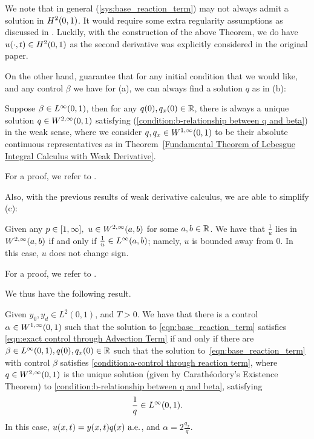 \documentclass{ifacconf}
\begin{document}
\begin{rem}
    We note that in general (\ref{sys:base_reaction_term}) may not always admit a solution in ${H^{2}_{}{\left ( 0,1 \right )}}$. It would require some extra regularity assumptions as discussed in \cite{evans_partial_2010}. Luckily, with the construction of the above Theorem, we do have $u(\cdot, t) \in {H^{2}_{}{\left ( 0,1 \right )}}$ as the second derivative was explicitly considered in the original paper.
\end{rem} 

On the other hand, \cite[Theorems 5.1 and 5.3, p. 30]{hale_ordinary_1980} guarantee that for any initial condition that we would like, and any control $\beta$ we have for (a), we can always find a solution $q$ as in (b):
\begin{prop}
    Suppose $\beta \in {L^{\infty}_{}{\left ( 0,1 \right )}}$, then for any $q(0), q_x(0) \in {\mathbb{R}}$,
    there is always a unique solution $q \in {W^{2, \infty}_{}{\left ( 0,1 \right )}}$ satisfying (\ref{condition:b-relationship between q and beta}) in the weak sense, where we consider $q, q_x \in {W^{1, \infty}_{}{\left ( 0,1 \right )}}$ to be their absolute continuous representatives as in Theorem~\ref{Fundamental Theorem of Lebesgue Integral Calculus with Weak Derivative}. 
\end{prop}
For a proof, we refer to \cite[Corollary 4.1.5]{yixing_multiplicative_2025}.

Also, with the previous results of weak derivative calculus, we are able to simplify (c):
\begin{prop}
    Given any $p \in [1,\infty], ~ u \in {W^{2,\infty}_{}{\left ( a,b \right )}}$ for some $a,b \in {\mathbb{R}}$. We have that $\frac{1}{u}$ lies in ${W^{2,\infty}_{}{\left ( a,b \right )}}$ if and only if $\frac{1}{u} \in {L^{\infty}_{}{\left ( a,b \right )}}$; namely, $u$ is bounded away from $0$. In this case,  $u$ does not change sign. 
\end{prop}

For a proof, we refer to \cite[Corollary 4.1.7]{yixing_multiplicative_2025}.

We thus have the following result.
\begin{thm}
\label{Necessary and Sufficient Condition for Transformation}
\cite[Theorem~4.1.8]{yixing_multiplicative_2025}
    Given $y_0, y_d \in L^2(0,1)$, and $T > 0$. We have that there is a control $\alpha \in {W^{1, \infty}_{}{\left ( 0,1 \right )}}$ such that the solution to \eqref{eqn:base_reaction_term} satisfies \eqref{eqn:exact control through Advection Term} if and only if there are $\beta \in {L^{\infty}_{}{\left ( 0,1 \right )}}, q(0), q_x(0) \in {\mathbb{R}}$ such that the solution to~\eqref{eqn:base_reaction_term} with control $\beta$ satisfies \eqref{condition:a-control through reaction term}, where $q \in {W^{2, \infty}_{}{\left ( 0,1 \right )}}$ is the unique solution (given by Carathéodory's Existence Theorem) to \eqref{condition:b-relationship between q and beta}, satisfying 
    \begin{equation}
    \label{condition:c-q is bounded away from 0}
        \frac{1}{q} \in {L^{\infty}_{}{\left ( 0,1 \right )}}.
    \end{equation}
    In this case, $u(x, t) = y(x,t)q(x) ~\text{a.e.}$, and $\alpha = 2\frac{q_x}{q}$.
\end{thm}
\end{document}
